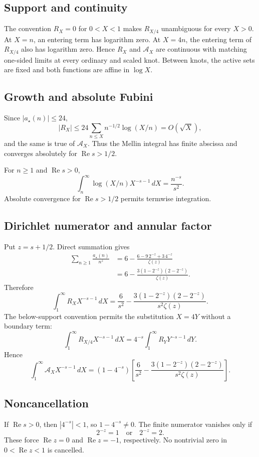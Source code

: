 \documentclass[11pt]{article}
\newcommand{\Ree}{\operatorname{Re}}
\newcommand{\Ann}{\mathcal A}
\begin{document}
\subsection{Support and continuity}
The convention $R_X=0$ for $0<X<1$ makes $R_{X/4}$ unambiguous for every $X>0$.  At $X=n$, an entering term has logarithm zero.  At $X=4n$, the entering term of $R_{X/4}$ also has logarithm zero.  Hence $R_X$ and $\Ann_X$ are continuous with matching one-sided limits at every ordinary and scaled knot.  Between knots, the active sets are fixed and both functions are affine in $\log X$.

\subsection{Growth and absolute Fubini}
Since $|a_\star(n)|\le24$,
\[
 |R_X|
 \le24\sum_{n\le X}n^{-1/2}\log(X/n)
 =O(\sqrt X),
\]
and the same is true of $\Ann_X$.  Thus the Mellin integral has finite abscissa and converges absolutely for $\Ree s>1/2$.

For $n\ge1$ and $\Ree s>0$,
\[
 \int_n^\infty\log(X/n)X^{-s-1}\,dX=\frac{n^{-s}}{s^2}.
\]
Absolute convergence for $\Ree s>1/2$ permits termwise integration.

\subsection{Dirichlet numerator and annular factor}
Put $z=s+1/2$.  Direct summation gives
\begin{align}
 \sum_{n\ge1}\frac{a_\star(n)}{n^z}
 &=6-\frac{6-9\,2^{-z}+3\,4^{-z}}{\zeta(z)}\\
 &=6-\frac{3(1-2^{-z})(2-2^{-z})}{\zeta(z)}.
\end{align}
Therefore
\[
 \int_1^\infty R_XX^{-s-1}\,dX
 =\frac6{s^2}
 -\frac{3(1-2^{-z})(2-2^{-z})}{s^2\zeta(z)}.
\]
The below-support convention permits the substitution $X=4Y$ without a boundary term:
\[
 \int_1^\infty R_{X/4}X^{-s-1}\,dX
 =4^{-s}\int_1^\infty R_YY^{-s-1}\,dY.
\]
Hence
\begin{equation}
\boxed{
 \int_1^\infty \Ann_XX^{-s-1}\,dX
 =(1-4^{-s})
 \left[
 \frac6{s^2}
 -\frac{3(1-2^{-z})(2-2^{-z})}{s^2\zeta(z)}
 \right].
}
\label{eq:mellin}
\end{equation}

\subsection{Noncancellation}
If $\Ree s>0$, then $|4^{-s}|<1$, so $1-4^{-s}\ne0$.  The finite numerator vanishes only if
\[
 2^{-z}=1\quad\text{or}\quad2^{-z}=2.
\]
These force $\Ree z=0$ and $\Ree z=-1$, respectively.  No nontrivial zero in $0<\Ree z<1$ is cancelled.
\end{document}
